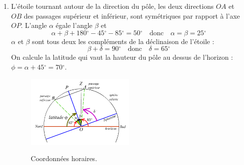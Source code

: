 \documentclass[a4paper,10pt]{report}
\renewcommand{\deg}{\ensuremath{^{\circ}}}
\begin{document}
\begin{Answer}
  \begin{enumerate}
  \item L'étoile tournant autour de la direction du pôle, les deux
    directions $OA$ et $OB$ des passages supérieur et inférieur, sont
    symétriques par rapport à l'axe $OP$. L'angle $\alpha$ égale
    l'angle $\beta$ et
    $$
    \alpha + \beta+180\deg - 45\deg -85\deg = 50\deg
    \quad\text{donc}\quad
    \alpha=\beta=25\deg
    $$
    $\alpha$ et $\beta$ sont tous deux les compléments de la
    déclinaison de l'étoile :
    $$
    \beta+\delta = 90\deg
    \quad\text{donc}\quad
    \delta=65\deg
    $$
    On calcule la latitude qui vaut la hauteur du pôle au dessus de
    l'horizon : $\phi=\alpha+45\deg=70\deg$.

    \begin{figure}[htp]
      \centering
      \includegraphics[width=0.5\textwidth]{coordonnees_horaire3}
      \label{coordonneeshoraire3}
      \caption{Coordonnées horaires.}
    \end{figure}


\end{enumerate}
\end{Answer}
\end{document}
